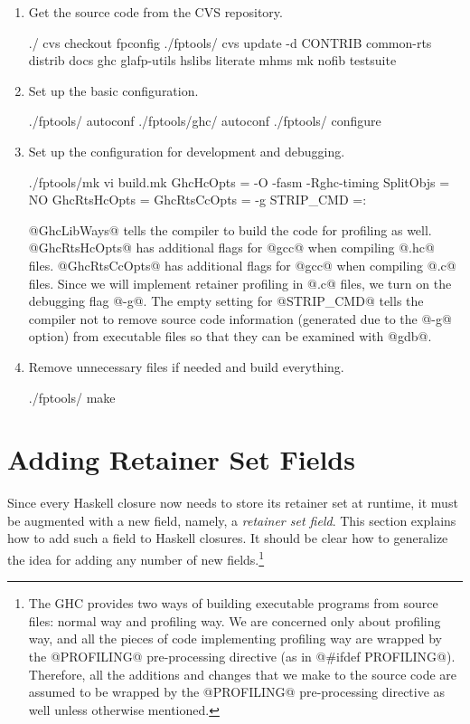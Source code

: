 \documentclass{article}
\begin{document}
\begin{enumerate}
\item Get the source code from the CVS repository.
\begin{code}
./              cvs checkout fpconfig
./fptools/      cvs update -d CONTRIB common-rts distrib docs ghc glafp-utils 
                    hslibs literate mhms mk nofib testsuite
\end{code}

\item Set up the basic configuration.
\begin{code}
./fptools/      autoconf                    
./fptools/ghc/  autoconf
./fptools/      configure
\end{code}

\item Set up the configuration for development and debugging.
\begin{code}
./fptools/mk    vi build.mk
    GhcHcOpts = -O -fasm -Rghc-timing
    SplitObjs = NO
    GhcRtsHcOpts = 
    GhcRtsCcOpts = -g
    STRIP_CMD =:
\end{code}
@GhcLibWays@ tells the compiler to build the code for profiling as well.
@GhcRtsHcOpts@ has additional flags for @gcc@ when compiling @.hc@ files.
@GhcRtsCcOpts@ has additional flags for @gcc@ when compiling @.c@ files.
Since we will implement retainer profiling in @.c@ files, we turn on the 
debugging flag @-g@. 
The empty setting for @STRIP_CMD@ tells the compiler not to remove source code
information (generated due to the @-g@ option) from executable files so that
they can be examined with @gdb@.

\item Remove unnecessary files if needed and build everything.
\begin{code}
./fptools/      make
\end{code}
\end{enumerate}

\section{Adding Retainer Set Fields}

Since every Haskell closure now needs to store its retainer set at runtime, 
it must be augmented with a new field,
namely, a \emph{retainer set field}.
This section explains how to add such a field to Haskell closures.
It should be clear how to generalize the idea for adding 
any number of new fields.\footnote{The GHC provides two 
ways of building executable programs from 
source files: normal way and profiling way. 
We are concerned only about profiling way, and all the pieces of code 
implementing profiling way are wrapped by the @PROFILING@ 
pre-processing directive (as in @\#ifdef PROFILING@).
Therefore, all the additions and changes that we make to the source code 
are assumed to be wrapped by the @PROFILING@ pre-processing 
directive as well unless otherwise mentioned.}
\end{document}
